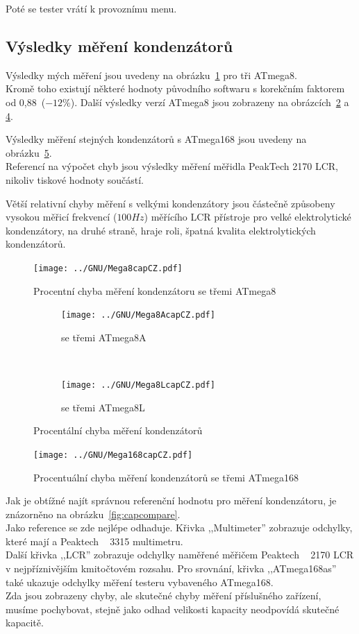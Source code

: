 Poté se tester vrátí k provoznímu menu.

\subsection{Výsledky měření kondenzátorů}
Výsledky mých měření jsou uvedeny na obrázku~\ref{fig:mega8cap} pro tři ATmega8.\\
Kromě toho existují některé hodnoty původního softwaru s korekčním faktorem
od 0,88~(\(-12\%\)).
Další výsledky verzí ATmega8 jsou zobrazeny na obrázcích~\ref{fig:mega8Acap} a \ref{fig:mega8Lcap}.

Výsledky měření stejných kondenzátorů s ATmega168 jsou uvedeny na obrázku~\ref{fig:mega168cap}.\\
Referencí na výpočet chyb jsou výsledky měření měřidla PeakTech 2170 LCR, nikoliv tiskové hodnoty součástí.

Větší relativní chyby měření s velkými kondenzátory jsou částečně způsobeny vysokou měřicí
frekvencí (\(100Hz\)) měřícího  LCR přístroje pro velké elektrolytické kondenzátory, na druhé straně, hraje  roli, špatná kvalita elektrolytických kondenzátorů.

\begin{figure}[H]
\centering
\texttt{[image: ../GNU/Mega8capCZ.pdf]}
\caption{Procentní chyba měření kondenzátoru se třemi ATmega8}
\label{fig:mega8cap}
\end{figure}

\begin{figure}[H]
  \begin{subfigure}[b]{9cm}
    \centering
    \texttt{[image: ../GNU/Mega8AcapCZ.pdf]}
    \caption{se třemi ATmega8A}
    \label{fig:mega8Acap}
  \end{subfigure}
  ~
  \begin{subfigure}[b]{9cm}
    \centering
    \texttt{[image: ../GNU/Mega8LcapCZ.pdf]}
    \caption{se třemi ATmega8L}
    \label{fig:mega8Lcap}
  \end{subfigure}
  \caption{Procentální chyba měření kondenzátorů}
\end{figure}

\begin{figure}[H]
\centering
\texttt{[image: ../GNU/Mega168capCZ.pdf]}
\caption{Procentuální chyba měření kondenzátorů se třemi ATmega168}
\label{fig:mega168cap}
\end{figure}

Jak je obtížné najít správnou referenční hodnotu pro měření kondenzátoru, je znázorněno na obrázku~\ref{fig:capcompare}.\\
Jako reference se zde nejlépe odhaduje. Křivka ,,Multimeter'' zobrazuje odchylky, které mají a
Peaktech ~ 3315 multimetru.\\
Další křivka ,,LCR'' zobrazuje odchylky naměřené měřičem Peaktech ~ 2170 LCR v nejpříznivějším kmitočtovém rozsahu.
Pro srovnání, křivka ,,ATmega168as'' také ukazuje odchylky měření testeru vybaveného ATmega168.\\
Zda jsou zobrazeny chyby, ale skutečné chyby měření příslušného zařízení, musíme pochybovat, stejně jako
odhad velikosti kapacity neodpovídá skutečné kapacitě.

